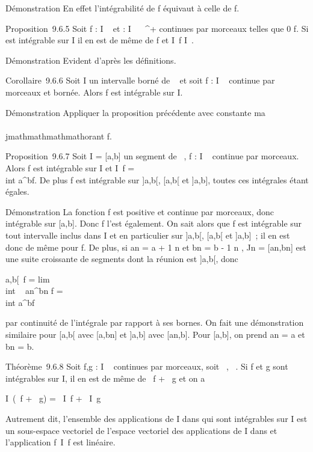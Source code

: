Démonstration En effet l'intégrabilité de f équivaut à celle de
\textbar{}f\textbar{}.

Proposition~9.6.5 Soit f : I \rightarrow~  et \phi : I \rightarrow~ ~^+ continues par
morceaux telles que 0 \leq\textbar{}f\textbar{}\leq \phi. Si \phi est intégrable sur
I il en est de même de f et \left
\textbar{}\int  I~f\right
\textbar{}\leq\int  I~\phi.

Démonstration Evident d'après les définitions.

Corollaire~9.6.6 Soit I un intervalle borné de ~ et soit f : I \rightarrow~ 
continue par morceaux et bornée. Alors f est intégrable sur I.

Démonstration Appliquer la proposition précédente avec \phi constante
ma\\\\jmathmathmathmathorant \textbar{}f\textbar{}.

Proposition~9.6.7 Soit I = {[}a,b{]} un segment de ~, f : I \rightarrow~  continue
par morceaux. Alors f est intégrable sur I et
\int  I~f =\\int
 a^bf. De plus f est intégrable sur {]}a,b{[},
{[}a,b{[} et {]}a,b{]}, toutes ces intégrales étant égales.

Démonstration La fonction \textbar{}f\textbar{} est positive et continue
par morceaux, donc intégrable sur {[}a,b{]}. Donc f l'est également. On
sait alors que \textbar{}f\textbar{} est intégrable sur tout intervalle
inclus dans I et en particulier sur {]}a,b{[}, {[}a,b{[} et {]}a,b{]}~;
il en est donc de même pour f. De plus, si an = a + 1
\over n et bn = b - 1 \over
n , Jn = {[}an,bn{]} est une suite
croissante de segments dont la réunion est {]}a,b{[}, donc

\int  {]}a,b{[}~f
= lim\\int ~
an^bn f =\\int
 a^bf

par continuité de l'intégrale par rapport à ses bornes. On fait une
démonstration similaire pour {[}a,b{[} avec {[}a,bn{]} et
{]}a,b{]} avec {[}an,b{]}. Pour {[}a,b{]}, on prend
an = a et bn = b.

Théorème~9.6.8 Soit f,g : I \rightarrow~  continues par morceaux, soit \alpha~,\beta~ \in {}. Si
f et g sont intégrables sur I, il en est de même de \alpha~f + \beta~g et on a

\int  I~(\alpha~f + \beta~g) =
\alpha~\int  I~f +
\beta~\int  I~g

Autrement dit, l'ensemble des applications de I dans  qui sont
intégrables sur I est un sous-espace vectoriel de l'espace vectoriel des
applications de I dans  et l'application
f\mapsto~\int  I~f
est linéaire.

